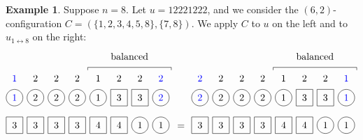 \documentclass[reqno]{amsart}
\newcommand{\0}{\phantom{c}}
\theoremstyle{plain}
\theoremstyle{definition}
\newtheorem{example}[thm]{Example}
\numberwithin{equation}{section}
\begin{document}
\begin{example}
Suppose $n = 8$.
Let $u = 12221222$, and we consider the $(6,2)$-configuration $C = (\{1,2,3,4,5,8\}, \{7,8\})$.
We apply $C$ to $u$ on the left and to $u_{1 \leftrightarrow 8}$ on the right:
\[
\begin{tikzpicture}[baseline=25]
  \def\sc{0.75}   %
  \def\lll{2.7}   %
  \def\ll{2}   %
  \def\l{1}   %
  \node[color=blue] at (1*\sc,\lll) {$1$};
  \node[color=blue] at (8*\sc,\lll) {$2$};
  \foreach \i in {5} { \node at (\i*\sc,\lll){$1$}; }
  \foreach \i in {2,3,4,6,7} { \node at (\i*\sc,\lll){$2$}; }
  \foreach \i in {1,2,3,4,5,8} { \draw (\i*\sc,\ll) circle (0.3); }
  \foreach \i in {6,7} { \draw (\i*\sc-.3,\ll-.3) rectangle +(0.6,+0.6); }
  \node[color=blue] at (1*\sc,\ll) {$1$};
  \node[color=blue] at (8*\sc,\ll) {$2$};
  \foreach \i in {5} { \node at (\i*\sc,\ll) {$1$}; }
  \foreach \i in {2,3,4} { \node at (\i*\sc,\ll) {$2$}; }
  \foreach \i in {6,7} { \node at (\i*\sc,\ll) {$3$}; }
  \foreach \i in {7,8} { \draw (\i*\sc,\l) circle (0.3); }
  \foreach \i in {1,2,3,4,5,6} { \draw (\i*\sc-.3,\l-.3) rectangle +(0.6,+0.6); }
  \foreach \i in {5,6} { \node at (\i*\sc,\l) {$4$}; }
  \foreach \i in {7,8} { \node at (\i*\sc,\l) {$1$}; }
  \foreach \i in {1,2,3,4} { \node at (\i*\sc,\l) {$3$}; }
  \draw (4.5*\sc,3) -- (4.5*\sc,3.1) -- (8.5*\sc,3.1) -- (8.5*\sc,3);
  \node at (6.5*\sc,3.5) {balanced};
\end{tikzpicture}
\hspace{3pt} = \hspace{4pt}
\begin{tikzpicture}[baseline=25]
  \def\sc{0.75}   %
  \def\lll{2.7}   %
  \def\ll{2}   %
  \def\l{1}   %
  \node[color=blue] at (8*\sc,\lll) {$1$};
  \node[color=blue] at (1*\sc,\lll) {$2$};
  \foreach \i in {5} { \node at (\i*\sc,\lll){$1$}; }
  \foreach \i in {2,3,4,6,7} { \node at (\i*\sc,\lll){$2$}; }
  \foreach \i in {1,2,3,4,5,8} { \draw (\i*\sc,\ll) circle (0.3); }
  \foreach \i in {6,7} { \draw (\i*\sc-.3,\ll-.3) rectangle +(0.6,+0.6); }
  \node[color=blue] at (8*\sc,\ll) {$1$};
  \node[color=blue] at (1*\sc,\ll) {$2$};
  \foreach \i in {5} { \node at (\i*\sc,\ll) {$1$}; }
  \foreach \i in {2,3,4} { \node at (\i*\sc,\ll) {$2$}; }
  \foreach \i in {6,7} { \node at (\i*\sc,\ll) {$3$}; }
  \foreach \i in {7,8} { \draw (\i*\sc,\l) circle (0.3); }
  \foreach \i in {1,2,3,4,5,6} { \draw (\i*\sc-.3,\l-.3) rectangle +(0.6,+0.6); }
  \foreach \i in {5,6} { \node at (\i*\sc,\l) {$4$}; }
  \foreach \i in {7,8} { \node at (\i*\sc,\l) {$1$}; }
  \foreach \i in {1,2,3,4} { \node at (\i*\sc,\l) {$3$}; }
  \draw (4.5*\sc,3) -- (4.5*\sc,3.1) -- (8.5*\sc,3.1) -- (8.5*\sc,3);
  \node at (6.5*\sc,3.5) {balanced};
\end{tikzpicture}
\]
\end{example}
\end{document}
